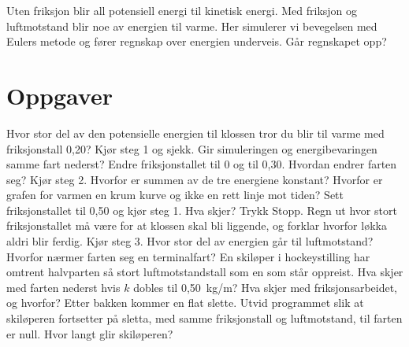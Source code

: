 \documentclass[11pt]{article}
\begin{document}

Uten friksjon blir all potensiell energi til kinetisk energi. Med friksjon og luftmotstand blir noe av energien til varme. Her simulerer vi bevegelsen med Eulers metode og fører regnskap over energien underveis. Går regnskapet opp?

\section*{Oppgaver}

\begin{oppgaveliste}
\oppgave {}Hvor stor del av den potensielle energien til klossen tror du blir til varme med friksjonstall 0,20? Kjør steg 1 og sjekk.
\svar
\oppgave {}Gir simuleringen og energibevaringen samme fart nederst? Endre friksjonstallet til 0 og til 0,30. Hvordan endrer farten seg?
\svar
\oppgave {}Kjør steg 2. Hvorfor er summen av de tre energiene konstant? Hvorfor er grafen for varmen en krum kurve og ikke en rett linje mot tiden?
\svar
\oppgave {}Sett friksjonstallet til 0,50 og kjør steg 1. Hva skjer? Trykk Stopp. Regn ut hvor stort friksjonstallet må være for at klossen skal bli liggende, og forklar hvorfor løkka aldri blir ferdig.
\svar
\oppgave {}Kjør steg 3. Hvor stor del av energien går til luftmotstand? Hvorfor nærmer farten seg en terminalfart?
\svar
\oppgave {}En skiløper i hockeystilling har omtrent halvparten så stort luftmotstandstall som en som står oppreist. Hva skjer med farten nederst hvis $k$ dobles til 0,50~kg/m? Hva skjer med friksjonsarbeidet, og hvorfor?
\svar
\oppgave {}Etter bakken kommer en flat slette. Utvid programmet slik at skiløperen fortsetter på sletta, med samme friksjonstall og luftmotstand, til farten er null. Hvor langt glir skiløperen?
\svar
\end{oppgaveliste}
\end{document}
